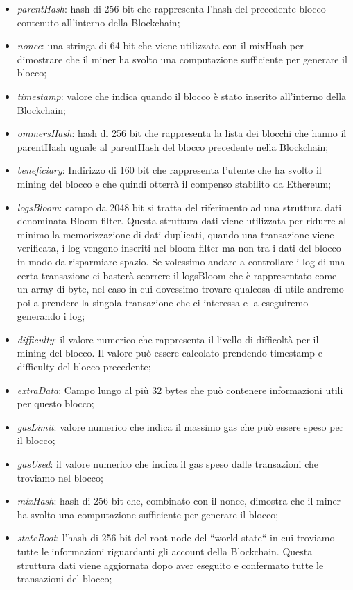 \documentclass[12pt]{report}
\begin{document}
\begin{itemize}
\item \textit{parentHash}: hash di 256 bit che rappresenta l'hash del precedente blocco contenuto all'interno della Blockchain;
\item \textit{nonce}: una stringa di 64 bit che viene utilizzata con il mixHash per dimostrare che il miner ha svolto una computazione sufficiente per generare il blocco;
\item \textit{timestamp}: valore che indica quando il blocco è stato inserito all'interno della Blockchain;
\item \textit{ommersHash}: hash di 256 bit che rappresenta la lista dei blocchi che hanno il parentHash uguale al parentHash del blocco precedente nella Blockchain;
\item \textit{beneficiary}: Indirizzo di 160 bit che rappresenta l'utente che ha svolto il mining del blocco e che quindi otterrà il compenso stabilito da Ethereum;
\item \textit{logsBloom}: campo da 2048 bit si tratta del riferimento ad una struttura dati denominata Bloom filter. 
Questa struttura dati viene utilizzata per ridurre al minimo la memorizzazione di dati duplicati, quando una transazione viene verificata, i log vengono inseriti nel bloom filter ma non tra i dati del blocco in modo da risparmiare spazio.
Se volessimo andare a controllare i log di una certa transazione ci basterà scorrere il logsBloom che è rappresentato come un array di byte, nel caso in cui dovessimo trovare qualcosa di utile andremo poi a prendere la singola transazione che ci interessa e la eseguiremo generando i log; \cite {BloomFilter}
\item \textit{difficulty}: il valore numerico che rappresenta il livello di difficoltà per il mining del blocco. Il valore può essere calcolato prendendo timestamp e difficulty del blocco precedente;
\item \textit{extraData}: Campo lungo al più 32 bytes che può contenere informazioni utili per questo blocco;
\item \textit{gasLimit}: valore numerico che indica il massimo gas che può essere speso per il blocco;
\item \textit{gasUsed}: il valore numerico che indica il gas speso dalle transazioni che troviamo nel blocco;
\item \textit{mixHash}: hash di 256 bit che, combinato con il nonce, dimostra che il miner ha svolto una computazione sufficiente per generare il blocco;
\item \textit{stateRoot}: l'hash di 256 bit del root node del ``world state`` in cui troviamo tutte le informazioni riguardanti gli account della Blockchain. Questa struttura dati viene aggiornata dopo aver eseguito e confermato tutte le transazioni del blocco;

\end{itemize}
\end{document}

